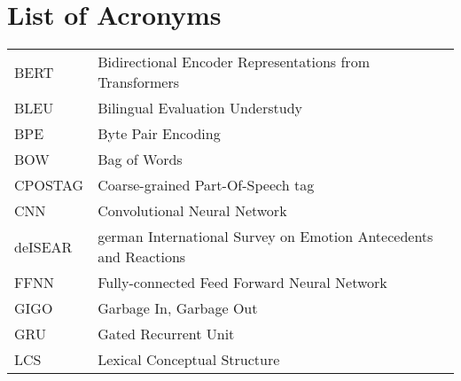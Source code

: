 {}
\chapter*{List of Acronyms}

\begin{supertabular}{lp{12.5cm}}
BERT    & Bidirectional Encoder Representations from Transformers\\
BLEU    & Bilingual Evaluation Understudy\\
BPE     & Byte Pair Encoding\\
BOW     & Bag of Words\\
CPOSTAG & Coarse-grained Part-Of-Speech tag\\
CNN     & Convolutional Neural Network\\
deISEAR & german International Survey on Emotion Antecedents and Reactions\\
FFNN    & Fully-connected Feed Forward Neural Network\\
GIGO    & Garbage In, Garbage Out\\
GRU     & Gated Recurrent Unit\\
LCS     & Lexical Conceptual Structure\\

\end{supertabular}
